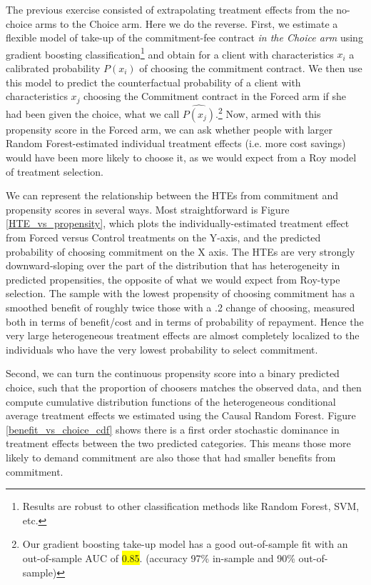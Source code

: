\documentclass[oneside,11pt]{article}
\begin{document}
   
The previous exercise consisted of extrapolating treatment effects from the no-choice arms to the Choice arm. Here we do the reverse. First, we estimate a flexible model of take-up of the commitment-fee contract \textit{in the Choice arm} using gradient boosting classification\footnote{Results are robust to other classification methods like Random Forest, SVM, etc.} and obtain for a client with characteristics $x_i$ a calibrated probability $P(x_i)$ of choosing the commitment contract. We then use this model to predict the counterfactual probability of a client with characteristics $x_j$ choosing the Commitment contract in the Forced arm if she had been given the choice, what we call $\widehat{P(x_j)}$.\footnote{Our gradient boosting take-up model has a good out-of-sample fit with an out-of-sample AUC of \colorbox{yellow}{0.85}. (accuracy 97\% in-sample and 90\% out-of-sample)} Now, armed with this propensity score in the Forced arm, we can ask whether people with larger Random Forest-estimated individual treatment effects (i.e. more cost savings) would have been more likely to choose it, as we would expect from a Roy model of treatment selection. 



We can represent the relationship between the HTEs from commitment and propensity scores in several ways.  Most straightforward is Figure \ref{HTE_vs_propensity}, which plots the individually-estimated treatment effect from Forced versus Control treatments on the Y-axis, and the predicted probability of choosing commitment on the X axis.  The HTEs are very strongly downward-sloping over the part of the distribution that has heterogeneity in predicted propensities, the opposite of what we would expect from Roy-type selection.  The sample with the lowest propensity of choosing commitment has a smoothed benefit of roughly twice those with a .2 change of choosing, measured both in terms of benefit/cost and in terms of probability of repayment.  Hence the very large heterogeneous treatment effects are almost completely localized to the individuals who have the very lowest probability to select commitment.


Second, we can turn the continuous propensity score into a binary predicted choice, such that the proportion of choosers matches the observed data, and then compute cumulative distribution functions of the heterogeneous conditional average treatment effects we estimated using the Causal Random Forest. Figure \ref{benefit_vs_choice_cdf} shows there is a first order stochastic dominance in treatment effects between the two predicted categories. This means those more likely to demand commitment are also those that had smaller benefits from commitment.
\end{document}
